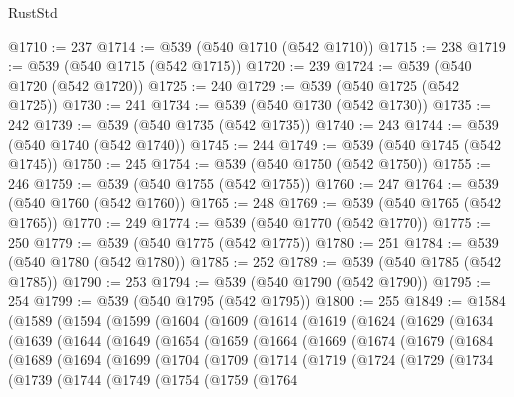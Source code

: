 \begin{lexlean}{RustStd}
\begin{coremodule}
{\begin{coremodule}
{{{{{{{{{{{{{{{{{{{{{{{{{{@1710 := 237
@1714 := @539 (@540 @1710 (@542 @1710))
@1715 := 238
@1719 := @539 (@540 @1715 (@542 @1715))
@1720 := 239
@1724 := @539 (@540 @1720 (@542 @1720))
@1725 := 240
@1729 := @539 (@540 @1725 (@542 @1725))
@1730 := 241
@1734 := @539 (@540 @1730 (@542 @1730))
@1735 := 242
@1739 := @539 (@540 @1735 (@542 @1735))
@1740 := 243
@1744 := @539 (@540 @1740 (@542 @1740))
@1745 := 244
@1749 := @539 (@540 @1745 (@542 @1745))
@1750 := 245
@1754 := @539 (@540 @1750 (@542 @1750))
@1755 := 246
@1759 := @539 (@540 @1755 (@542 @1755))
@1760 := 247
@1764 := @539 (@540 @1760 (@542 @1760))
@1765 := 248
@1769 := @539 (@540 @1765 (@542 @1765))
@1770 := 249
@1774 := @539 (@540 @1770 (@542 @1770))
@1775 := 250
@1779 := @539 (@540 @1775 (@542 @1775))
@1780 := 251
@1784 := @539 (@540 @1780 (@542 @1780))
@1785 := 252
@1789 := @539 (@540 @1785 (@542 @1785))
@1790 := 253
@1794 := @539 (@540 @1790 (@542 @1790))
@1795 := 254
@1799 := @539 (@540 @1795 (@542 @1795))
@1800 := 255
@1849 := @1584
    (@1589
      (@1594
        (@1599
          (@1604
            (@1609
              (@1614
                (@1619
                  (@1624
                    (@1629
                      (@1634
                        (@1639
                          (@1644
                            (@1649
                              (@1654
                                (@1659
                                  (@1664
                                    (@1669
                                      (@1674
                                        (@1679
                                          (@1684
                                            (@1689
                                              (@1694
                                                (@1699
                                                  (@1704
                                                    (@1709
                                                      (@1714
                                                        (@1719
                                                          (@1724
                                                            (@1729
                                                              (@1734
                                                                (@1739
                                                                  (@1744
                                                                    (@1749
                                                                      (@1754
                                                                        (@1759
                                                                          (@1764
}}}}}}}}}}}}}}}}}}}}}}}}}}
\end{coremodule}}
\end{coremodule}
\end{lexlean}
